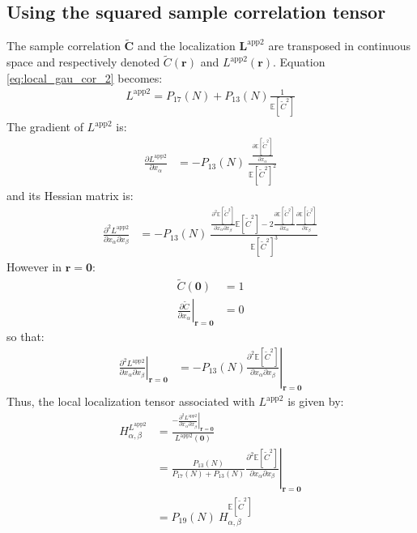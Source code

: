\documentclass[12pt]{scrartcl}
\begin{document}
\subsection{Using the squared sample correlation tensor}
The sample correlation $\widetilde{\mathbf{C}}$ and the localization $\mathbf{L}^\mathrm{app2}$ are transposed in continuous space and respectively denoted $\widetilde{C}(\mathbf{r})$ and $L^\mathrm{app2}(\mathbf{r})$. Equation \eqref{eq:local_gau_cor_2} becomes:
\begin{align}
L^\mathrm{app2} = P_{17}(N) + P_{13}(N) \frac{1}{\mathbb{E} \left[\widetilde{C}^2\right]}
\end{align}
The gradient of $L^\mathrm{app2}$ is:
\begin{align}
\frac{\partial L^\mathrm{app2}}{\partial x_\alpha} & = - P_{13}(N) \ \frac{\displaystyle \frac{\partial \mathbb{E} \left[\widetilde{C}^2\right]}{\displaystyle \partial x_\alpha}}{\mathbb{E} \left[\widetilde{C}^2\right]^2}
\end{align}
and its Hessian matrix is:
\begin{align}
\frac{\partial^2 L^\mathrm{app2}}{\partial x_\alpha \partial x_\beta} & = - P_{13}(N) \ \frac{\displaystyle \frac{\partial^2 \mathbb{E} \left[\widetilde{C}^2\right]}{\displaystyle \partial x_\alpha \partial x_\beta} \mathbb{E} \left[\widetilde{C}^2\right] - 2 \frac{\partial \mathbb{E} \left[\widetilde{C}^2\right]}{\displaystyle \partial x_\alpha} \frac{\partial \mathbb{E} \left[\widetilde{C}^2\right]}{\displaystyle \partial x_\beta}}{\mathbb{E} \left[\widetilde{C}^2\right]^3}
\end{align}
However in $\mathbf{r} = \mathbf{0}$:
\begin{subequations}
\begin{align}
\widetilde{C}(\mathbf{0}) & = 1 \\
\left.\frac{\partial \widetilde{C}}{\partial x_\alpha}\right|_{\mathbf{r}=\mathbf{0}} & = 0
\end{align}
\end{subequations}
so that:
\begin{align}
\left.\frac{\partial^2 L^\mathrm{app2}}{\partial x_\alpha \partial x_\beta}\right|_{\mathbf{r}=\mathbf{0}} & = - P_{13}(N) \left.\frac{\partial^2 \mathbb{E} \left[\widetilde{C}^2\right]}{\displaystyle \partial x_\alpha \partial x_\beta} \right|_{\mathbf{r}=\mathbf{0}}
\end{align}
Thus, the local localization tensor associated with $L^\mathrm{app2}$ is given by:
\begin{align}
H^{L^\mathrm{app2}}_{\alpha,\beta} & = \frac{\displaystyle - \left.\frac{\partial^2 L^\mathrm{app2}}{\partial x_\alpha \partial x_\beta}\right|_{\mathbf{r}=\mathbf{0}}}{L^\mathrm{app2}(\mathbf{0})} \nonumber \\
& = \frac{P_{13}(N)}{P_{17}(N) + P_{13}(N)} \left.\frac{\partial^2 \mathbb{E} \left[\widetilde{C}^2\right]}{\displaystyle \partial x_\alpha \partial x_\beta} \right|_{\mathbf{r}=\mathbf{0}} \nonumber \\
& = P_{19}(N) \ H^{\mathbb{E} \left[\widetilde{C}^2\right]}_{\alpha,\beta}
\end{align}
\end{document}
